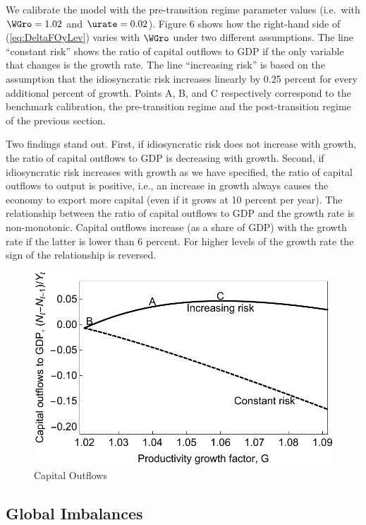 \documentclass[titlepage]{\econtex}\newcommand{\texname}{cjSOE}
\begin{document}
We calibrate the model with the pre-transition regime parameter values
(i.e.\ with $\WGro=1.02$ and $\urate=0.02$). Figure 6 shows how the
right-hand side of (\ref{eq:DeltaFOyLev}) varies with $\WGro$ under
two different assumptions. The line ``constant risk'' shows the ratio
of capital outflows to GDP if the only variable that changes is the
growth rate. The line ``increasing risk'' is based on the assumption
that the idiosyncratic risk increases linearly by 0.25 percent for
every additional percent of growth. Points A, B, and C respectively
correspond to the benchmark calibration, the pre-transition regime and
the post-transition regime of the previous section.

Two findings stand out. First, if idiosyncratic risk does not increase
with growth, the ratio of capital outflows to GDP is decreasing with
growth. Second, if idiosyncratic risk increases with growth as we have
specified, the ratio of capital outflows to output is positive, i.e.,
an increase in growth always causes the economy to export more capital
(even if it grows at 10 percent per year). The relationship between
the ratio of capital outflows to GDP and the growth rate is
non-monotonic. Capital outflows increase (as a share of GDP) with the
growth rate if the latter is lower than 6 percent. For higher levels
of the growth rate the sign of the relationship is reversed.

\medskip

\begin{figure}
\includegraphics{./Figures/capOutflows}
\caption{Capital Outflows}\label{fig:capOutflows}
\end{figure}

\medskip


\subsection{Global Imbalances}
\end{document}
